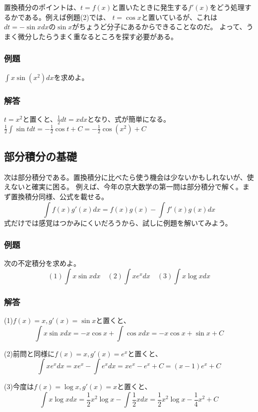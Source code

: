 \documentclass[a4j,dvipdfmx]{jsarticle}
\begin{document}
置換積分のポイントは、$t=f(x)$と置いたときに発生する$f'(x)$をどう処理するかである。例えば例題(2)では、
$t=\cos x$と置いているが、これは$dt=-\sin x dx$の$\sin x$がちょうど分子にあるからできることなのだ。
よって、うまく微分したらうまく重なるところを探す必要がある。
\subsubsection{例題}
$\displaystyle \int x\sin(x^2)dx$を求めよ。
\subsubsection*{解答}
$t=x^2$と置くと、$\frac{1}{2}dt=xdx$となり、式が簡単になる。
$\displaystyle \frac{1}{2}\int \sin tdt=-\frac{1}{2}\cos t+C=-\frac{1}{2}\cos (x^2)+C$
\newpage
\subsection{部分積分の基礎}
次は部分積分である。置換積分に比べたら使う機会は少ないかもしれないが、使えないと確実に困る。
例えば、今年の京大数学の第一問は部分積分で解く。まず置換積分同様、公式を載せる。
\begin{equation*}
    \int f(x)g'(x)dx=f(x)g(x)-\int f'(x)g(x)dx
\end{equation*}
式だけでは感覚はつかみにくいだろうから、試しに例題を解いてみよう。
\subsubsection{例題}
次の不定積分を求めよ。
\begin{equation*}
    (1)\int x\sin xdx\quad (2)\int xe^x dx \quad (3)\int x\log x dx
\end{equation*}
\subsubsection*{解答}
(1)$f(x)=x,g'(x)=\sin x$と置くと、
\begin{equation*}
    \int x\sin x dx=-x\cos x+\int \cos xdx=-x\cos x+\sin x+C 
\end{equation*}

(2)前問と同様に$f(x)=x,g'(x)=e^x$と置くと、
\begin{equation*}
    \int xe^x dx=xe^x-\int e^xdx=xe^x-e^x+C=(x-1)e^x +C
\end{equation*}

(3)今度は$f(x)=\log x,g'(x)=x$と置くと、
\begin{equation*}
    \int x\log xdx=\frac{1}{2}x^2\log x-\int \frac{1}{2}xdx=\frac{1}{2}x^2\log x-\frac{1}{4}x^2+C
\end{equation*}
\end{document}
